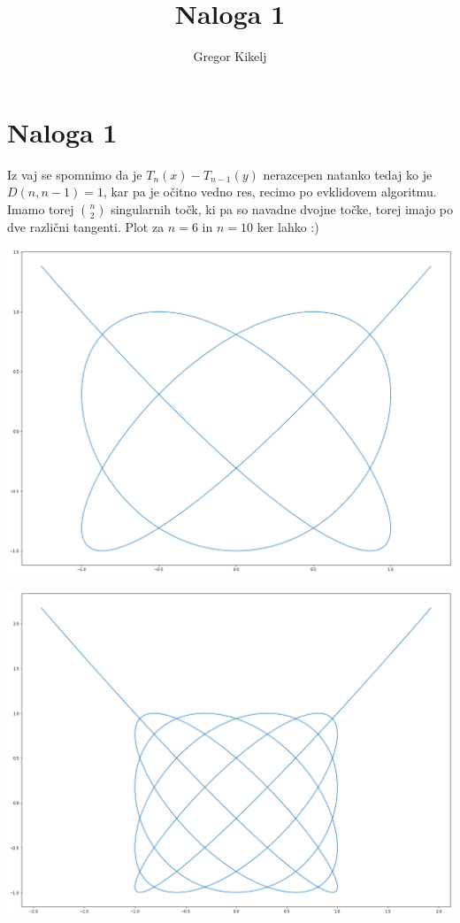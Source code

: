\documentclass[12pt]{article}
\title{Naloga 1}
\author{Gregor Kikelj}
\begin{document}
\section{Naloga 1}
Iz vaj se spomnimo da je $T_n(x)-T_{n-1}(y)$ nerazcepen natanko tedaj ko je 
$D(n, n-1)=1$, kar pa je očitno vedno res, recimo po evklidovem algoritmu. Imamo torej $n \choose 2$
singularnih točk, ki pa so navadne dvojne točke, torej imajo po dve različni tangenti. 
Plot za $n=6$ in $n=10$ ker lahko :)

\includegraphics[scale=0.25]{plot6.png}

\includegraphics[scale=0.25]{plot10.png}
\end{document}
